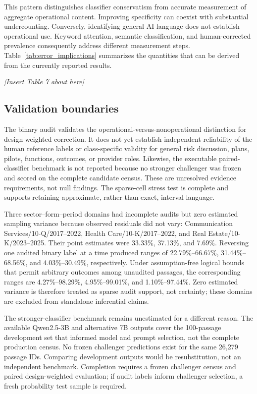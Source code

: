 \documentclass[12pt]{article}
\newcommand{\placement}[1]{%
  \begin{center}
    \vspace{0.5\baselineskip}
    \textit{[Insert #1 about here]}
    \vspace{0.5\baselineskip}
  \end{center}
}
\begin{document}
This pattern distinguishes classifier conservatism from accurate measurement
of aggregate operational content. Improving specificity can coexist with
substantial undercounting. Conversely, identifying general AI language does
not establish operational use. Keyword attention, semantic classification,
and human-corrected prevalence consequently address different measurement
steps. Table~\ref{tab:error_implications} summarizes the quantities that can
be derived from the currently reported results.

\placement{Table 7}

\subsection{Validation boundaries}

The binary audit validates the operational-versus-nonoperational distinction
for design-weighted correction. It does not yet establish independent
reliability of the human reference labels or class-specific validity for
general risk discussion, plans, pilots, functions, outcomes, or provider
roles. Likewise, the executable paired-classifier benchmark is not reported
because no stronger challenger was frozen and scored on the complete
candidate census. These are unresolved evidence requirements, not null
findings. The sparse-cell stress test is complete and supports retaining
approximate, rather than exact, interval language.

Three sector--form--period domains had incomplete audits but zero estimated
sampling variance because observed residuals did not vary:
Communication Services/10-Q/2017--2022, Health Care/10-K/2017--2022, and
Real Estate/10-K/2023--2025. Their point estimates were 33.33\%, 37.13\%,
and 7.69\%. Reversing one audited binary label at a time produced ranges of
22.79\%--66.67\%, 31.44\%--68.56\%, and 4.03\%--30.49\%, respectively.
Under assumption-free logical bounds that permit arbitrary outcomes among
unaudited passages, the corresponding ranges are 4.27\%--98.29\%,
4.95\%--99.01\%, and 1.10\%--97.44\%. Zero estimated variance is therefore
treated as sparse audit support, not certainty; these domains are excluded
from standalone inferential claims.

The stronger-classifier benchmark remains unestimated for a different reason.
The available Qwen2.5-3B and alternative 7B outputs cover the 100-passage
development set that informed model and prompt selection, not the complete
production census. No frozen challenger predictions exist for the same
26,279 passage IDs. Comparing development outputs would be resubstitution,
not an independent benchmark. Completion requires a frozen challenger census
and paired design-weighted evaluation; if audit labels inform challenger
selection, a fresh probability test sample is required.
\end{document}
